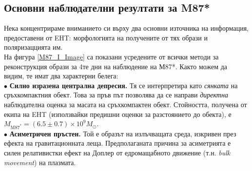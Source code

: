 \subsection{Основни наблюдателни резултати за M87*}

Нека концентрираме вниманието си върху два основни източника на информация, предоставени от EHT: морфологията на получените от тях образи и поляризаццията им. \\

На фигура \ref*{M87_I_Image} са показани усредените от всички методи за реконструкция образи за 4те дни на наблюдение на М87*. Както можем да видим, те имат два характерни белега:\\

$\bullet$ \textbf{Силно изразена централна депресия.} Тя се интерпретира като \emph{сянката} на сръхкомпактния обект. Това за пръв път позволява да се направи \emph{директна} наблюдателна оценка за масата на сръхкомпактен обект. Стойността, получена от екипа на EHT (използвайки предишни оценки за разстоянието до обекта), е $M_{\text{M87}^*} = (6.5\pm 0.7)\times 10^{9} M_\odot$.\\

$\bullet$ \textbf{Асиметричен пръстен.} Той е образът на излъчващата среда, изкривен през ефекта на гравитационната леща. Предполаганата причина за асиметрията е силен релативистки ефект на Доплер от едромащабното движение (т.н. \emph{bulk movement}) на плазмата.\\

